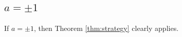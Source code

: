 \documentclass[../main.tex]{subfiles}
\begin{document}
\subsection{$a = \pm 1$}
If $a = \pm 1$, then Theorem \ref{thm:strategy} clearly applies. 
  
\end{document}

